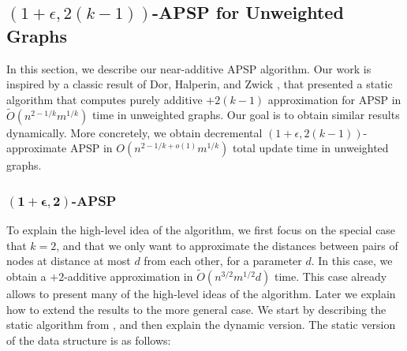 \documentclass[11pt]{article}
\makeatletter
\theoremstyle{definition}
\theoremstyle{remark}
\renewcommand{\paragraph}{%
  \@startsection{paragraph}{4}%
  {\z@}{1.4ex \@plus 1ex \@minus .2ex}{-1em}%
  {\normalfont\normalsize\bfseries}%
}
\makeatother
\begin{document}
\begin{titlepage}
\subsection{\texorpdfstring{$(1+\epsilon, 2(k-1))$}{(1+epsilon,2(k-1))}-APSP for Unweighted Graphs} \label{sec:add_overview}


In this section, we describe our near-additive APSP algorithm.
Our work is inspired by a classic result of Dor, Halperin, and Zwick \cite{DHZ00}, that presented a static algorithm that computes purely additive $+2(k-1)$ approximation for APSP in $\tilde{O}(n^{2-1/k}m^{1/k})$ time in unweighted graphs. Our goal is to obtain similar results dynamically. 
More concretely, we obtain decremental $(1+\epsilon,2(k-1))$-approximate APSP in $O(n^{2-1/k+o(1)}m^{1/k})$ total update time in unweighted graphs.

\subsubsection{\texorpdfstring{$\mathbf{(1+\epsilon,2)}$}{(1+epsilon)}-APSP}
To explain the high-level idea of the algorithm, we first focus on the special case that $k=2$, and that we only want to approximate the distances between pairs of nodes at distance at most $d$ from each other, for a parameter $d$. In this case, we obtain a $+2$-additive approximation in $\tilde{O}(n^{3/2}m^{1/2} d )$ time. This case already allows to present many of the high-level ideas of the algorithm. Later we explain how to extend the results to the more general case.
 We start by describing the static algorithm from \cite{DHZ00}, and then explain the dynamic version. 
The static version of the data structure is as follows:


\end{titlepage}
\end{document}
